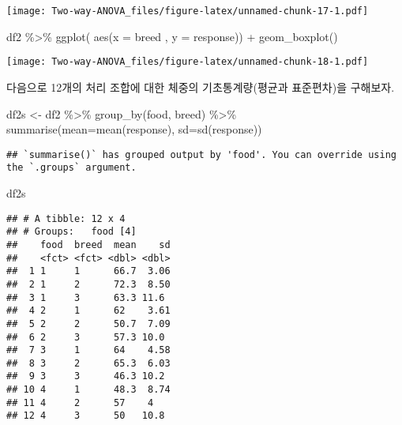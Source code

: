 \documentclass[
]{book}
\newenvironment{Shaded}{\begin{snugshade}}{\end{snugshade}}
\newcommand{\AttributeTok}[1]{\textcolor[rgb]{0.77,0.63,0.00}{#1}}
\newcommand{\FunctionTok}[1]{\textcolor[rgb]{0.00,0.00,0.00}{#1}}
\newcommand{\NormalTok}[1]{#1}
\newcommand{\OtherTok}[1]{\textcolor[rgb]{0.56,0.35,0.01}{#1}}
\newcommand{\SpecialCharTok}[1]{\textcolor[rgb]{0.00,0.00,0.00}{#1}}
\begin{document}
\texttt{[image: Two-way-ANOVA\_files/figure-latex/unnamed-chunk-17-1.pdf]}

\begin{Shaded}
\begin{Highlighting}[]
\NormalTok{df2 }\SpecialCharTok{\%\textgreater{}\%} 
  \FunctionTok{ggplot}\NormalTok{( }\FunctionTok{aes}\NormalTok{(}\AttributeTok{x =}\NormalTok{ breed , }\AttributeTok{y =}\NormalTok{ response))  }\SpecialCharTok{+}
  \FunctionTok{geom\_boxplot}\NormalTok{()}
\end{Highlighting}
\end{Shaded}

\texttt{[image: Two-way-ANOVA\_files/figure-latex/unnamed-chunk-18-1.pdf]}

다음으로 12개의 처리 조합에 대한 체중의 기초통계량(평균과 표준편차)을 구해보자.

\begin{Shaded}
\begin{Highlighting}[]
\NormalTok{df2s }\OtherTok{\textless{}{-}}\NormalTok{ df2 }\SpecialCharTok{\%\textgreater{}\%} \FunctionTok{group\_by}\NormalTok{(food, breed)  }\SpecialCharTok{\%\textgreater{}\%}  \FunctionTok{summarise}\NormalTok{(}\AttributeTok{mean=}\FunctionTok{mean}\NormalTok{(response),  }\AttributeTok{sd=}\FunctionTok{sd}\NormalTok{(response))}
\end{Highlighting}
\end{Shaded}

\begin{verbatim}
## `summarise()` has grouped output by 'food'. You can override using the `.groups` argument.
\end{verbatim}

\begin{Shaded}
\begin{Highlighting}[]
\NormalTok{df2s}
\end{Highlighting}
\end{Shaded}

\begin{verbatim}
## # A tibble: 12 x 4
## # Groups:   food [4]
##    food  breed  mean    sd
##    <fct> <fct> <dbl> <dbl>
##  1 1     1      66.7  3.06
##  2 1     2      72.3  8.50
##  3 1     3      63.3 11.6 
##  4 2     1      62    3.61
##  5 2     2      50.7  7.09
##  6 2     3      57.3 10.0 
##  7 3     1      64    4.58
##  8 3     2      65.3  6.03
##  9 3     3      46.3 10.2 
## 10 4     1      48.3  8.74
## 11 4     2      57    4   
## 12 4     3      50   10.8
\end{verbatim}
\end{document}
